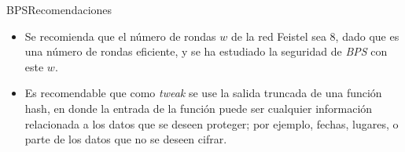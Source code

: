 \begin{frame}{BPS}{Recomendaciones}

  \begin{itemize}
    \item Se recomienda que el número de rondas $w$ de la red Feistel sea 
      $8$, dado que es una número de rondas eficiente, y se ha estudiado 
      la seguridad de \textit{BPS} con este $w$.
    
    \item Es recomendable que como \textit{tweak} se use la salida truncada de
      una función hash, en donde la entrada de la función puede ser cualquier 
      información relacionada a los datos que se deseen proteger; por 
      ejemplo, fechas, lugares, o parte de los datos que no se deseen cifrar. 
  \end{itemize}
  
\end{frame}

